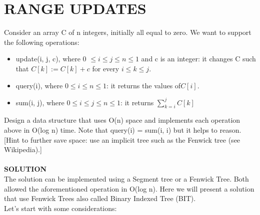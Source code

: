 \documentclass[a4paper]{article}
\begin{document}
\section*{RANGE UPDATES}
Consider an array C of n integers, initially all equal to zero. We want to support the following operations:
\begin{itemize}
\item update(i, j, c), where 0 $\leq i \leq j \leq n \leq 1$ and c is an integer: it changes C such
that $C[k] := C[k] + c$ for every $i \leq k \leq j$.
\item query(i), where $0 \leq i \leq n \leq 1$: it returns the values of$ C[i]$.
\item sum(i, j), where $0 \leq i \leq j \leq n \leq 1$: it returns $\sum_{k=i}^{j} C[k]$
\end{itemize}
Design a data structure that uses O(n) space and implements each operation above in O(log n) time. Note that query(i) = sum(i, i) but it helps to reason. [Hint to further save space: use an implicit tree such as the Fenwick tree (see Wikipedia).]\\
\\
\textbf{SOLUTION}
\\
The solution can be implemented using a Segment tree or a Fenwick Tree. Both allowed the aforementioned operation in O(log n). Here we will present a solution that use Fenwick Trees also called Binary Indexed Tree (BIT).\\
Let's start with some considerations: 
\end{document}
